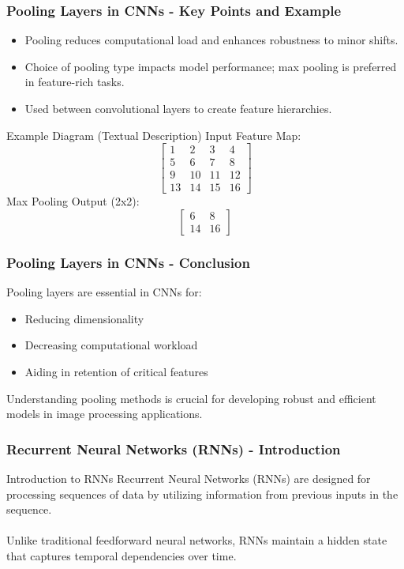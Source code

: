 \documentclass{beamer}
\begin{document}
\begin{frame}[fragile]
    \frametitle{Pooling Layers in CNNs - Key Points and Example}
    \begin{itemize}
        \item Pooling reduces computational load and enhances robustness to minor shifts.
        \item Choice of pooling type impacts model performance; max pooling is preferred in feature-rich tasks.
        \item Used between convolutional layers to create feature hierarchies.
    \end{itemize}

    \begin{block}{Example Diagram (Textual Description)}
        Input Feature Map:
        \[
        \begin{bmatrix}
        1 & 2 & 3 & 4 \\
        5 & 6 & 7 & 8 \\
        9 & 10 & 11 & 12 \\
        13 & 14 & 15 & 16
        \end{bmatrix}
        \]
        Max Pooling Output (2x2):
        \[
        \begin{bmatrix}
        6 & 8 \\
        14 & 16
        \end{bmatrix}
        \]
    \end{block}
\end{frame}

\begin{frame}[fragile]
    \frametitle{Pooling Layers in CNNs - Conclusion}
    Pooling layers are essential in CNNs for:
    \begin{itemize}
        \item Reducing dimensionality
        \item Decreasing computational workload
        \item Aiding in retention of critical features
    \end{itemize}
    Understanding pooling methods is crucial for developing robust and efficient models in image processing applications.
\end{frame}

\begin{frame}[fragile]
    \frametitle{Recurrent Neural Networks (RNNs) - Introduction}
    \begin{block}{Introduction to RNNs}
        Recurrent Neural Networks (RNNs) are designed for processing sequences of data by utilizing information from previous inputs in the sequence.
        \\ \\
        Unlike traditional feedforward neural networks, RNNs maintain a hidden state that captures temporal dependencies over time.
    \end{block}
\end{frame}
\end{document}
